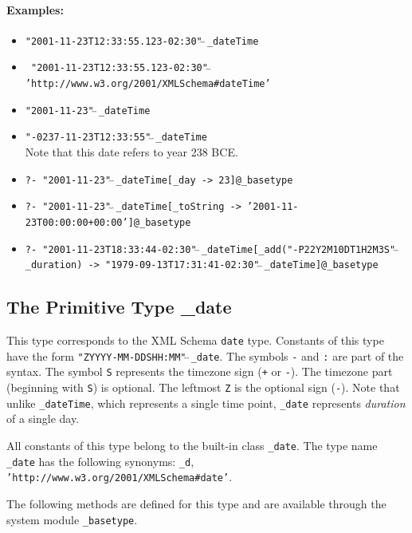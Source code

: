 \documentclass[11pt]{article}
\begin{document}
\paragraph{Examples:}
\begin{itemize}
      \item {\tt "2001-11-23T12:33:55.123-02:30"$\hat{~}\hat{~}$\_dateTime} 
      \item
        {\tt
          "2001-11-23T12:33:55.123-02:30"$\hat{~}\hat{~}$'http://www.w3.org/2001/XMLSchema\#dateTime'} 
      \item {\tt "2001-11-23"$\hat{~}\hat{~}$\_dateTime}  
      \item {\tt "-0237-11-23T12:33:55"$\hat{~}\hat{~}$\_dateTime}\\ 
        Note that this date refers to year 238 BCE.
      \item {\tt ?- "2001-11-23"$\hat{~}\hat{~}$\_dateTime[\_day -> 23]@\_basetype}  
      \item {\tt ?- "2001-11-23"$\hat{~}\hat{~}$\_dateTime[\_toString ->
        '2001-11-23T00:00:00+00:00']@\_basetype}  
      \item {\tt ?- "2001-11-23T18:33:44-02:30"$\hat{~}\hat{~}$\_dateTime[\_add("-P22Y2M10DT1H2M3S"$\hat{~}\hat{~}$\_duration)
      -> "1979-09-13T17:31:41-02:30"$\hat{~}\hat{~}$\_dateTime]@\_basetype}  
      \end{itemize}

\subsection{ The Primitive Type \_date}

This type corresponds to the XML Schema {\tt date} type.  Constants of this
type have the form {\tt "ZYYYY-MM-DDSHH:MM"$\hat{~}\hat{~}$\_date}.  The
symbols {\tt -} and {\tt :} are part of the syntax. The symbol {\tt S}
represents the timezone sign ({\tt +} or {\tt -}). The timezone part
(beginning with {\tt S}) is optional. The leftmost {\tt Z} is the optional
sign ({\tt -}). Note that unlike {\tt \_dateTime}, which represents a
single time point, {\tt \_date}  represents \emph{duration} of a single day.


All constants of this type belong to the built-in class {\tt \_date}. 
The type name {\tt \_date} has the following synonyms: 
{\tt \_d},  {\tt 'http://www.w3.org/2001/XMLSchema\#date'}. 

The following methods are defined for this type and are available through
the system module {\tt \_basetype}.
\end{document}

